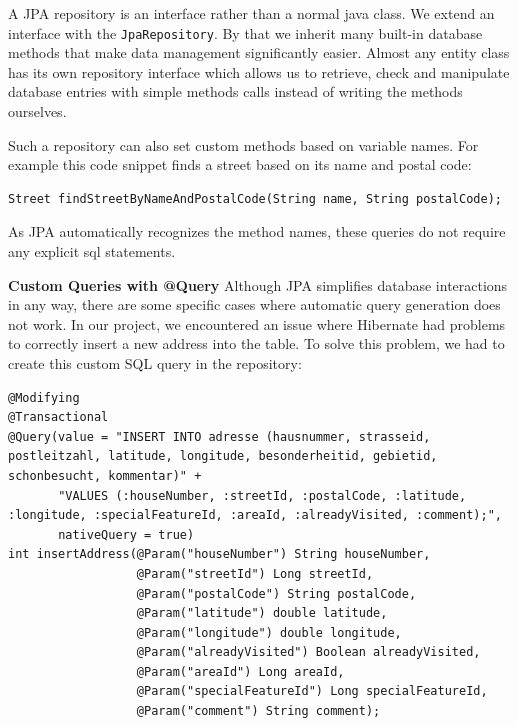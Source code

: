     A JPA repository is an interface rather than a normal java class. We extend an interface with the \texttt{JpaRepository}. By that we inherit many built-in database methods that make data management significantly easier. Almost any entity class has its own repository interface which allows us to retrieve, check and manipulate database entries with simple methods calls instead of writing the methods ourselves. \newline

    Such a repository can also set custom methods based on variable names. For example this code snippet finds a street based on its name and postal code:
    \lstset{style=mycsharp, caption=Find Street By Name And Postal Code}
    \begin{lstlisting}
Street findStreetByNameAndPostalCode(String name, String postalCode);          
    \end{lstlisting} 
    As JPA automatically recognizes the method names, these queries do not require any explicit sql statements.

    \textbf{Custom Queries with @Query} \newline
    Although JPA simplifies database interactions in any way, there are some specific cases where automatic query generation does not work. In our project, we encountered an issue where Hibernate had problems to correctly insert a new address into the table. To solve this problem, we had to create this custom SQL query in the repository:
    \lstset{style=mycsharp, caption=Insert Address with Custom Query}
    \begin{lstlisting}
@Modifying
@Transactional
@Query(value = "INSERT INTO adresse (hausnummer, strasseid, postleitzahl, latitude, longitude, besonderheitid, gebietid, schonbesucht, kommentar)" +
       "VALUES (:houseNumber, :streetId, :postalCode, :latitude, :longitude, :specialFeatureId, :areaId, :alreadyVisited, :comment);",
       nativeQuery = true)
int insertAddress(@Param("houseNumber") String houseNumber,
                  @Param("streetId") Long streetId,
                  @Param("postalCode") String postalCode,
                  @Param("latitude") double latitude,
                  @Param("longitude") double longitude,
                  @Param("alreadyVisited") Boolean alreadyVisited,
                  @Param("areaId") Long areaId,
                  @Param("specialFeatureId") Long specialFeatureId,
                  @Param("comment") String comment);          
    \end{lstlisting} 

